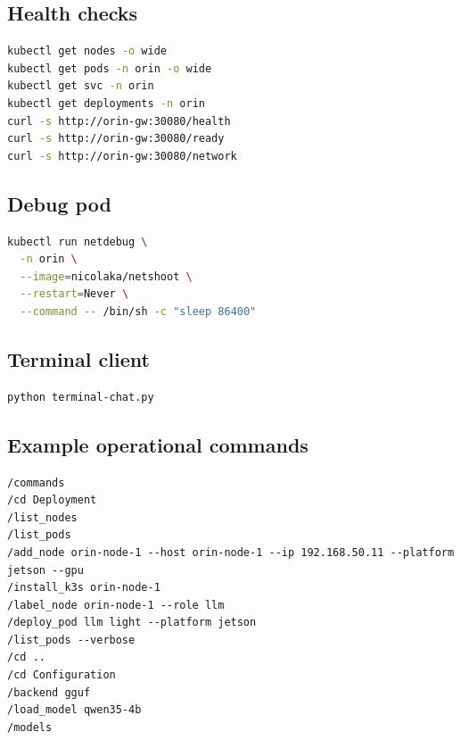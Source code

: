 \documentclass[11pt,a4paper]{article}
\begin{document}
\subsection{Health checks}
\begin{lstlisting}[language=bash]
kubectl get nodes -o wide
kubectl get pods -n orin -o wide
kubectl get svc -n orin
kubectl get deployments -n orin
curl -s http://orin-gw:30080/health
curl -s http://orin-gw:30080/ready
curl -s http://orin-gw:30080/network
\end{lstlisting}

\subsection{Debug pod}
\begin{lstlisting}[language=bash]
kubectl run netdebug \
  -n orin \
  --image=nicolaka/netshoot \
  --restart=Never \
  --command -- /bin/sh -c "sleep 86400"
\end{lstlisting}

\subsection{Terminal client}
\begin{lstlisting}[language=bash]
python terminal-chat.py
\end{lstlisting}

\subsection{Example operational commands}
\begin{lstlisting}
/commands
/cd Deployment
/list_nodes
/list_pods
/add_node orin-node-1 --host orin-node-1 --ip 192.168.50.11 --platform jetson --gpu
/install_k3s orin-node-1
/label_node orin-node-1 --role llm
/deploy_pod llm light --platform jetson
/list_pods --verbose
/cd ..
/cd Configuration
/backend gguf
/load_model qwen35-4b
/models
\end{lstlisting}
\end{document}
